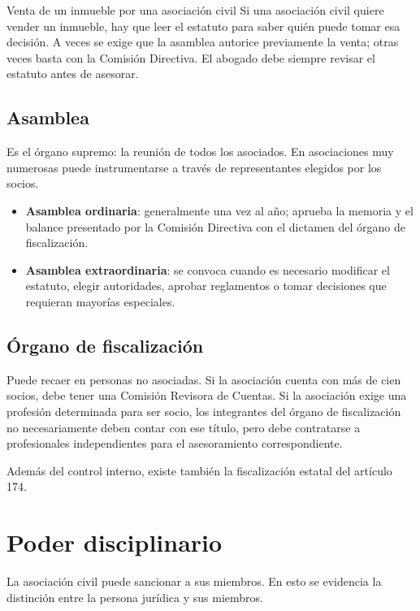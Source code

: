 \documentclass[12pt,oneside]{book}
\begin{document}
\begin{example}{Venta de un inmueble por una asociación civil}
Si una asociación civil quiere vender un inmueble, hay que leer el estatuto para saber quién puede tomar esa decisión. A veces se exige que la asamblea autorice previamente la venta; otras veces basta con la Comisión Directiva. El abogado debe siempre revisar el estatuto antes de asesorar.
\end{example}

\subsection{Asamblea}

Es el órgano supremo: la reunión de todos los asociados. En asociaciones muy numerosas puede instrumentarse a través de representantes elegidos por los socios.

\begin{itemize}
    \item \textbf{Asamblea ordinaria}: generalmente una vez al año; aprueba la memoria y el balance presentado por la Comisión Directiva con el dictamen del órgano de fiscalización.
    \item \textbf{Asamblea extraordinaria}: se convoca cuando es necesario modificar el estatuto, elegir autoridades, aprobar reglamentos o tomar decisiones que requieran mayorías especiales.
\end{itemize}

\subsection{Órgano de fiscalización}

Puede recaer en personas no asociadas. Si la asociación cuenta con más de cien socios, debe tener una Comisión Revisora de Cuentas. Si la asociación exige una profesión determinada para ser socio, los integrantes del órgano de fiscalización no necesariamente deben contar con ese título, pero debe contratarse a profesionales independientes para el asesoramiento correspondiente.

Además del control interno, existe también la fiscalización estatal del artículo 174.

\section{Poder disciplinario}

La asociación civil puede sancionar a sus miembros. En esto se evidencia la distinción entre la persona jurídica y sus miembros.
\end{document}
